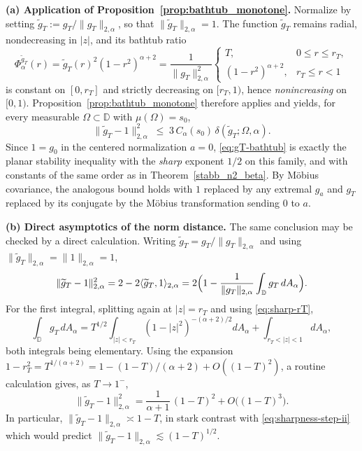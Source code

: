 \documentclass[a4paper,10pt]{amsart}
\newcommand{\D}{\mathbb{D}}
\begin{document}
\smallskip
\noindent\textbf{(a) Application of Proposition~\ref{prop:bathtub_monotone}.}
Normalize by setting $\widetilde g_T:=g_T/\|g_T\|_{2,\alpha}$, so that
$\|\widetilde g_T\|_{2,\alpha}=1$. The function $\widetilde g_T$ remains radial,
nondecreasing in $|z|$, and its bathtub ratio
\[
\Phi_\alpha^{\widetilde g_T}(r)
=
\widetilde g_T(r)^2(1-r^2)^{\alpha+2}
=
\frac{1}{\|g_T\|_{2,\alpha}^2}
\begin{cases}T,& 0\le r\le r_T,\\[2pt](1-r^2)^{\alpha+2},& r_T\le r<1\end{cases}
\]
is constant on $[0,r_T]$ and strictly decreasing on $[r_T,1)$, hence
\emph{nonincreasing} on $[0,1)$. Proposition~\ref{prop:bathtub_monotone} therefore
applies and yields, for every measurable $\Omega\subset\D$ with
$\mu(\Omega)=s_0$,
\begin{equation}\label{eq:gT-bathtub}
\|\widetilde g_T-1\|_{2,\alpha}^2
\;\le\;
3\,C_\alpha(s_0)\,\delta(\widetilde g_T;\Omega,\alpha).
\end{equation}
Since $1=g_0$ in the centered normalization $a=0$, \eqref{eq:gT-bathtub} is
exactly the planar stability inequality with the \emph{sharp} exponent
$1/2$ on this family, and with constants of the same order as in
Theorem~\ref{stabb_n2_beta}. By Möbius covariance, the analogous bound holds with
$1$ replaced by any extremal $g_a$ and $g_T$ replaced by its conjugate by the
Möbius transformation sending $0$ to $a$.

\smallskip
\noindent\textbf{(b) Direct asymptotics of the norm distance.}
The same conclusion may be checked by a direct calculation. Writing
$\widetilde g_T=g_T/\|g_T\|_{2,\alpha}$ and using
$\|\widetilde g_T\|_{2,\alpha}=\|1\|_{2,\alpha}=1$,
\[
\|\widetilde g_T-1\|_{2,\alpha}^2
=
2-2\langle\widetilde g_T,1\rangle_{2,\alpha}
=
2\Bigl(1-\frac{1}{\|g_T\|_{2,\alpha}}\int_\D g_T\,dA_\alpha\Bigr).
\]
For the first integral, splitting again at $|z|=r_T$ and using
\eqref{eq:sharp-rT},
\[
\int_\D g_T\,dA_\alpha
=
T^{1/2}\int_{|z|<r_T}(1-|z|^2)^{-(\alpha+2)/2}dA_\alpha
+\int_{r_T<|z|<1}dA_\alpha,
\]
both integrals being elementary. Using the expansion
$1-r_T^2=T^{1/(\alpha+2)}=1-(1-T)/(\alpha+2)+O((1-T)^2)$, a routine
calculation gives, as $T\to 1^-$,
\begin{equation}\label{eq:gT-distance-asymp}
\|\widetilde g_T-1\|_{2,\alpha}^2
=
\frac{1}{\alpha+1}\,(1-T)^2
+O\bigl((1-T)^3\bigr).
\end{equation}
In particular, $\|\widetilde g_T-1\|_{2,\alpha}\asymp 1-T$, in stark contrast
with \eqref{eq:sharpness-step-ii} which would predict
$\|\widetilde g_T-1\|_{2,\alpha}\lesssim(1-T)^{1/2}$.
\end{document}
